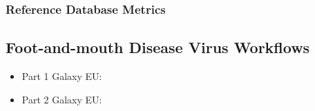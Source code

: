 %
\subsubsection*{\thesubsubsection \quad Reference Database Metrics}\label{sec:apx-aiv-refs}

% 
\subsection*{\thesubsection \quad Foot-and-mouth Disease Virus Workflows}\label{sec:apx-fmdv-links}
\begin{itemize}
	\setlength{\itemsep}{-0.4cm}
	\item Part 1 Galaxy EU: \texttt{\todoit}
	\item Part 2 Galaxy EU: \texttt{\todoit}
\end{itemize}
